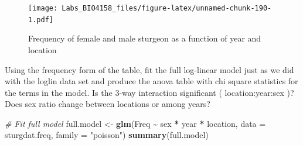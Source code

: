 \documentclass[
  12pt,
]{book}
\makeatletter
\newenvironment{Shaded}{\begin{snugshade}}{\end{snugshade}}
\newcommand{\CommentTok}[1]{\textcolor[rgb]{0.56,0.35,0.01}{\textit{#1}}}
\newcommand{\DataTypeTok}[1]{\textcolor[rgb]{0.13,0.29,0.53}{#1}}
\newcommand{\KeywordTok}[1]{\textcolor[rgb]{0.13,0.29,0.53}{\textbf{#1}}}
\newcommand{\NormalTok}[1]{#1}
\newcommand{\OperatorTok}[1]{\textcolor[rgb]{0.81,0.36,0.00}{\textbf{#1}}}
\newcommand{\StringTok}[1]{\textcolor[rgb]{0.31,0.60,0.02}{#1}}
\newenvironment{kframe}{%
\medskip{}
\setlength{\fboxsep}{.8em}
\def\at@end@of@kframe{}%
\ifinner\ifhmode%
 \def\at@end@of@kframe{\end{minipage}}%
 \begin{minipage}{\columnwidth}%
\fi\fi%
\def\FrameCommand##1{\hskip\@totalleftmargin \hskip-\fboxsep
\colorbox{incolor}{##1}\hskip-\fboxsep
    \hskip-\linewidth \hskip-\@totalleftmargin \hskip\columnwidth}%
\MakeFramed {\advance\hsize-\width
  \@totalleftmargin\z@ \linewidth\hsize
  \@setminipage}}%
{\par\unskip\endMakeFramed%
\at@end@of@kframe}
\newenvironment{rmdblock}[1]
 {
 \begin{itemize}
 \renewcommand{\labelitemi}{
   \raisebox{-.7\height}[0pt][0pt]{
     {\setkeys{Gin}{width=3em,keepaspectratio}\texttt{[image: images/\#1]}}
   }
 }
 \begin{kframe}
 \setlength{\fboxsep}{1em}
 \item
 }
 {
 \end{kframe}
 \end{itemize}
 }
\newenvironment{rmdcode}
  {\begin{rmdblock}{screen}}
  {\end{rmdblock}}
\makeatother
\begin{document}
\begin{figure}
\centering
\texttt{[image: Labs\_BIO4158\_files/figure-latex/unnamed-chunk-190-1.pdf]}
\caption{\label{fig:unnamed-chunk-190}Frequency of female and male sturgeon as a function of year and location}
\end{figure}

\begin{rmdcode}
Using the frequency form of the table, fit the full log-linear model just as we did with the loglin data set and produce the anova table with chi square statistics for the terms in the model. Is the 3-way interaction significant ( location:year:sex )? Does sex ratio change between locations or among years?
\end{rmdcode}

\begin{Shaded}
\begin{Highlighting}[]
\CommentTok{\# Fit full model}
\NormalTok{full.model \textless{}{-}}\StringTok{ }\KeywordTok{glm}\NormalTok{(Freq }\OperatorTok{\textasciitilde{}}\StringTok{ }\NormalTok{sex }\OperatorTok{*}\StringTok{ }\NormalTok{year }\OperatorTok{*}\StringTok{ }\NormalTok{location, }\DataTypeTok{data =}\NormalTok{ sturgdat.freq, }\DataTypeTok{family =} \StringTok{"poisson"}\NormalTok{)}
\KeywordTok{summary}\NormalTok{(full.model)}
\end{Highlighting}
\end{Shaded}
\end{document}

